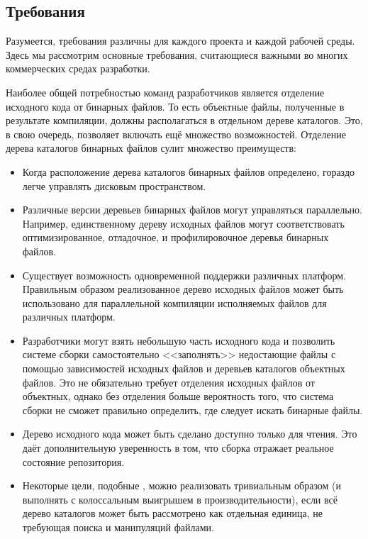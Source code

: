 \subsection*{Требования}

Разумеется, требования различны для каждого проекта и каждой рабочей
среды. Здесь мы рассмотрим основные требования, считающиеся важными во
многих коммерческих средах разработки.

Наиболее общей потребностью команд разработчиков является отделение
исходного кода от бинарных файлов. То есть объектные файлы,
полученные в результате компиляции, должны располагаться в отдельном
дереве каталогов. Это, в свою очередь, позволяет включать ещё
множество возможностей. Отделение дерева каталогов бинарных файлов
сулит множество преимуществ:

\begin{itemize}
\item Когда расположение дерева каталогов бинарных файлов определено,
гораздо легче управлять дисковым пространством.
\item Различные версии деревьев бинарных файлов могут управляться
параллельно. Например, единственному дереву исходных файлов могут
соответствовать оптимизированное, отладочное, и профилировочное
деревья бинарных файлов.
\item Существует возможность одновременной поддержки различных
платформ. Правильным образом реализованное дерево исходных файлов
может быть использовано для параллельной компиляции исполняемых файлов
для различных платформ.
\item Разработчики могут взять небольшую часть исходного кода и
позволить системе сборки самостоятельно <<заполнять>> недостающие
файлы с помощью зависимостей исходных файлов и деревьев каталогов
объектных файлов. Это не обязательно требует отделения исходных файлов
от объектных, однако без отделения больше вероятность того, что
система сборки не сможет правильно определить, где следует искать
бинарные файлы.
\item Дерево исходного кода может быть сделано доступно только для
чтения. Это даёт дополнительную уверенность в том, что сборка отражает
реальное состояние репозитория.
\item Некоторые цели, подобные , можно реализовать
тривиальным образом (и выполнять с колоссальным выигрышем в
производительности), если всё дерево каталогов может быть рассмотрено
как отдельная единица, не требующая поиска и манипуляций файлами.
\end{itemize}


